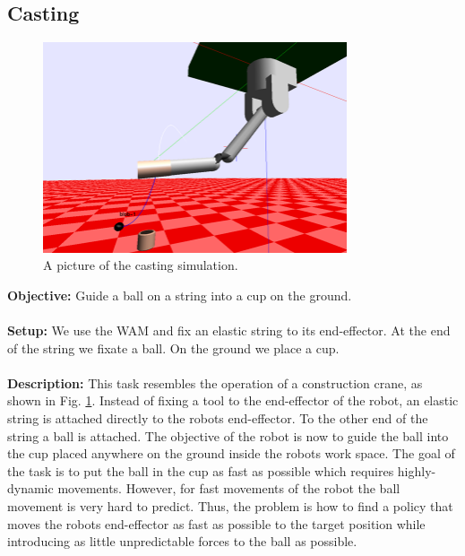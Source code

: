 \documentclass[11pt, article, colorback]{article}
\begin{document}
\subsection{Casting}
\begin{figure}
\centering
 \includegraphics[width=0.8\textwidth]{Pics/Casting.png}
  \caption{A picture of the casting simulation.}
  \label{pic:casting}
\end{figure}
%
\textbf{Objective:} Guide a ball on a string into a cup on the ground. \\ \\
%
\textbf{Setup:} We use the WAM and fix an elastic string to its end-effector. At the end of the string we fixate a ball. On the ground we place 
a cup. \\ \\
%
\textbf{Description:} 
This task resembles the operation of a construction crane, as shown in Fig. \ref{pic:casting}. Instead of fixing a tool to the end-effector of the robot, an elastic string is 
attached directly to the robots end-effector. To the other end of the string a ball is attached. The objective of the robot is now to 
guide the ball into the cup placed anywhere on the ground inside the robots work space. The goal of the task is to put the ball in the cup as fast as possible which requires highly-dynamic movements. However, for fast movements of the robot the ball movement is very hard to predict. 
Thus, the problem is how to find a policy that moves the robots end-effector as fast as possible to the target 
position while introducing as little unpredictable forces to the ball as possible. 
\end{document}
